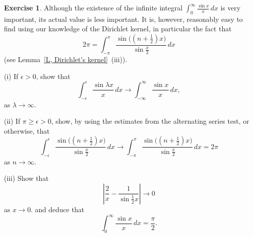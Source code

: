 \documentclass[12pt]{article}
\theoremstyle{definition}
\newtheorem{question}{Exercise}[section]
\begin{document}
\begin{question}\label{Q, infinite Dirichlet 2}
Although the existence of the infinite integral
$\int_{0}^{\infty}\frac{\sin x}{x}\,dx$ is very important,
its actual value is less important. It is, however, reasonably
easy to find using our knowledge of the Dirichlet
kernel, in particular the fact that
\[2\pi=\int_{-\pi}^{\pi}\frac{\sin\big((n+\tfrac{1}{2})x\big)}
{\sin \tfrac{x}{2}}\,dx\]
(see Lemma~\ref{L, Dirichlet's kernel}~(iii)).

(i) If $\epsilon>0$, show that
\[\int_{-\epsilon}^{\epsilon}\frac{\sin \lambda x}{x}\,dx
\rightarrow
\int_{-\infty}^{\infty}\frac{\sin x}{x}\,dx,\]
as $\lambda\rightarrow\infty$.

(ii) If $\pi\geq \epsilon>0$, show, by using the
estimates from the alternating series test, or otherwise, that
\[\int_{-\epsilon}^{\epsilon}
\frac{\sin\big((n+\tfrac{1}{2})x\big)}
{\sin \tfrac{x}{2}}\,dx\rightarrow
\int_{-\pi}^{\pi}\frac{\sin\big((n+\tfrac{1}{2})x\big)}
{\sin \tfrac{x}{2}}\,dx=2\pi\]
as $n\rightarrow\infty$.

(iii) Show that
\[\left|\frac{2}{x}-\frac{1}{\sin \tfrac{1}{2}x}\right|\rightarrow 0\]
as $x\rightarrow 0$.
and deduce that
\[\int_{0}^{\infty}\frac{\sin x}{x}\,dx=\frac{\pi}{2}.\]
\end{question}
\end{document}
